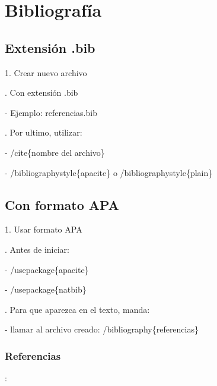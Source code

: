 \documentclass{article}
\begin{document}
\newpage
\section{Bibliografía}
\subsection{Extensión .bib}
1. Crear nuevo archivo

. Con extensión .bib

- Ejemplo: referencias.bib

. Por ultimo, utilizar:

- /cite\{nombre del archivo\}

- /bibliographystyle\{apacite\} o /bibliographystyle\{plain\}


\subsection{Con formato APA}
1. Usar formato APA

. Antes de iniciar:

- /usepackage\{apacite\}

- /usepackage\{natbib\}

. Para que aparezca en el texto, manda:

- llamar al archivo creado: /bibliography\{referencias\}


\subsubsection{Referencias}: 


\cite{ref1, ref2, ref3, ref4}

\end{document}
